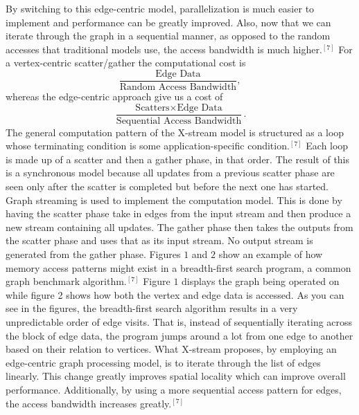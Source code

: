 \documentclass[conference]{IEEEtran}
\begin{document}
By switching to this edge-centric model, parallelization is much easier to implement and performance can be greatly improved.  Also, now that we can iterate through the graph in a sequential manner, as opposed to the random accesses that traditional models use, the access bandwidth is much higher.$^{[7]}$  For a vertex-centric scatter/gather the computational cost is $$\dfrac{\text{Edge Data}}{\text{Random Access Bandwidth}},$$ whereas the edge-centric approach give us a cost of $$\dfrac{\text{Scatters} \times \text{Edge Data}}{\text{Sequential Access Bandwidth}}.$$  The general computation pattern of the X-stream model is structured as a loop whose terminating condition is some application-specific condition.$^{[7]}$  Each loop is made up of a scatter and then a gather phase, in that order.  The result of this is a synchronous model because all updates from a previous scatter phase are seen only after the scatter is completed but before the next one has started.  Graph streaming is used to implement the computation model.  This is done by having the scatter phase take in edges from the input stream and then produce a new stream containing all updates.  The gather phase then takes the outputs from the scatter phase and uses that as its input stream.  No output stream is generated from the gather phase.  Figures $1$ and $2$ show an example of how memory access patterns might exist in a breadth-first search program, a common graph benchmark algorithm.$^{[7]}$  Figure $1$ displays the graph being operated on while figure 2 shows how both the vertex and edge data is accessed.  As you can see in the figures, the breadth-first search algorithm results in a very unpredictable order of edge visits.  That is, instead of sequentially iterating across the block of edge data, the program jumps around a lot from one edge to another based on their relation to vertices.  What X-stream proposes, by employing an edge-centric graph processing model, is to iterate through the list of edges linearly.  This change greatly improves spatial locality which can improve overall performance.  Additionally, by using a more sequential access pattern for edges, the access bandwidth increases greatly.$^{[7]}$  
\end{document}
